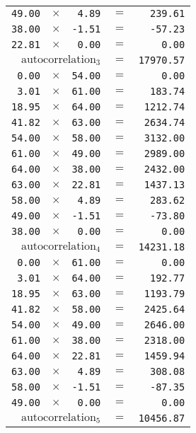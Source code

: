 {\begin{multicols}{2}
\begin{tabular}{rrrrr}
  \texttt{49.00} & $\times$ & \texttt{4.89} & $=$ & \texttt{239.61} \\
  \texttt{38.00} & $\times$ & \texttt{-1.51} & $=$ & \texttt{-57.23} \\
  \texttt{22.81} & $\times$ & \texttt{0.00} & $=$ & \texttt{0.00} \\
  \hline
  \multicolumn{3}{r}{$\text{autocorrelation}_3$} & $=$ & \texttt{17970.57} \\
  \hline
  \hline
  \texttt{0.00} & $\times$ & \texttt{54.00} & $=$ & \texttt{0.00} \\
  \texttt{3.01} & $\times$ & \texttt{61.00} & $=$ & \texttt{183.74} \\
  \texttt{18.95} & $\times$ & \texttt{64.00} & $=$ & \texttt{1212.74} \\
  \texttt{41.82} & $\times$ & \texttt{63.00} & $=$ & \texttt{2634.74} \\
  \texttt{54.00} & $\times$ & \texttt{58.00} & $=$ & \texttt{3132.00} \\
  \texttt{61.00} & $\times$ & \texttt{49.00} & $=$ & \texttt{2989.00} \\
  \texttt{64.00} & $\times$ & \texttt{38.00} & $=$ & \texttt{2432.00} \\
  \texttt{63.00} & $\times$ & \texttt{22.81} & $=$ & \texttt{1437.13} \\
  \texttt{58.00} & $\times$ & \texttt{4.89} & $=$ & \texttt{283.62} \\
  \texttt{49.00} & $\times$ & \texttt{-1.51} & $=$ & \texttt{-73.80} \\
  \texttt{38.00} & $\times$ & \texttt{0.00} & $=$ & \texttt{0.00} \\
  \hline
  \multicolumn{3}{r}{$\text{autocorrelation}_4$} & $=$ & \texttt{14231.18} \\
  \hline
  \hline
  \texttt{0.00} & $\times$ & \texttt{61.00} & $=$ & \texttt{0.00} \\
  \texttt{3.01} & $\times$ & \texttt{64.00} & $=$ & \texttt{192.77} \\
  \texttt{18.95} & $\times$ & \texttt{63.00} & $=$ & \texttt{1193.79} \\
  \texttt{41.82} & $\times$ & \texttt{58.00} & $=$ & \texttt{2425.64} \\
  \texttt{54.00} & $\times$ & \texttt{49.00} & $=$ & \texttt{2646.00} \\
  \texttt{61.00} & $\times$ & \texttt{38.00} & $=$ & \texttt{2318.00} \\
  \texttt{64.00} & $\times$ & \texttt{22.81} & $=$ & \texttt{1459.94} \\
  \texttt{63.00} & $\times$ & \texttt{4.89} & $=$ & \texttt{308.08} \\
  \texttt{58.00} & $\times$ & \texttt{-1.51} & $=$ & \texttt{-87.35} \\
  \texttt{49.00} & $\times$ & \texttt{0.00} & $=$ & \texttt{0.00} \\
  \hline
  \multicolumn{3}{r}{$\text{autocorrelation}_5$} & $=$ & \texttt{10456.87}
\end{tabular}
\end{multicols}

}
